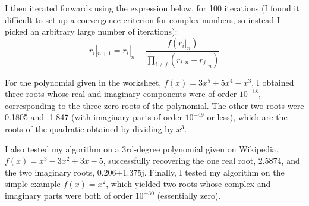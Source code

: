 \documentclass{article}
\begin{document}
I then iterated forwards using the expression below, for 100 iterations (I found it difficult to set up a convergence
criterion for complex numbers, so instead I picked an arbitrary large number of iterations):
\begin{equation}
	r_i|_{n+1} = r_i|_n - \frac{f(r_i|_n)}{\prod_{i{\neq}j} (r_i|_n - r_j|_n)}
\end{equation}

For the polynomial given in the worksheet, $f(x)=3x^5+5x^4-x^3$, I obtained three roots whose real and imaginary components were
of order $10^{-18}$, corresponding to the three zero roots of the polynomial.  The other two roots were 0.1805 and -1.847 (with imaginary parts
of order $10^{-49}$ or less), which are the roots of the quadratic obtained by dividing by $x^3$.

I also tested my algorithm on a 3rd-degree polynomial given on Wikipedia, $f(x)=x^3-3x^2+3x-5$, successfully recovering the one real root, 2.5874,
and the two imaginary roots, 0.206$\pm$1.375j.  Finally, I tested my algorithm on the simple example $f(x)=x^2$, which yielded two roots whose
complex and imaginary parts were both of order $10^{-30}$ (essentially zero).
\end{document}
